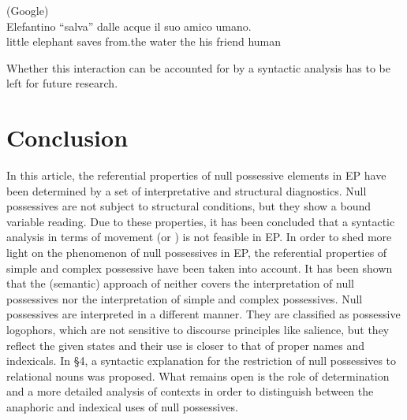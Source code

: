 \documentclass[output=paper]{langsci/langscibook}
\begin{document}
\ea%
          (Google) \label{ex:wein:53}\\
    \gll Elefantino “salva” dalle acque il suo amico umano.\\
         {little elephant} saves from.the water the his friend human\\
\z

\ea%
    \label{ex:wein:54}
    \z
\z

Whether this interaction can be accounted for by a syntactic analysis has to be left for future research.

\section{Conclusion}%
In this article, the referential properties of null possessive elements in EP have been determined by a set of interpretative and structural diagnostics. Null possessives are not subject to structural conditions, but they show a bound variable reading. Due to these properties, it has been concluded that a syntactic analysis in terms of movement (or ) is not feasible in EP. In order to shed more light on the phenomenon of null possessives in EP, the referential properties of simple and complex possessive have been taken into account. It has been shown that the (semantic) approach of \citet{Reinhart2006} neither covers the interpretation of null possessives nor the interpretation of simple and complex possessives. Null possessives are interpreted in a different manner. They are classified as possessive logophors, which are not sensitive to discourse principles like salience, but they reflect the given states and their use is closer to that of proper names and indexicals. In §4, a syntactic explanation for the restriction of null possessives to relational nouns was proposed. What remains open is the role of determination and a more detailed analysis of contexts in order to distinguish between the anaphoric and indexical uses of null possessives.
\end{document}
